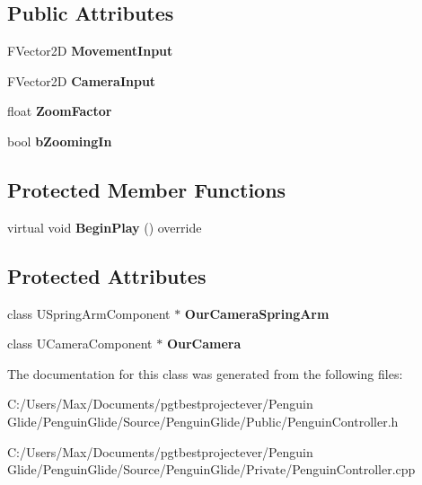 \subsection*{Public Attributes}
\begin{DoxyCompactItemize}
\item 
\mbox{\label{class_a_penguin_controller_ad5e38d4bab697a120a0aec8643aabdea}} 
F\+Vector2D {\bfseries Movement\+Input}
\item 
\mbox{\label{class_a_penguin_controller_ac51051e3396e7fa3f5dce0acc7a1d4ee}} 
F\+Vector2D {\bfseries Camera\+Input}
\item 
\mbox{\label{class_a_penguin_controller_a180900572c3dde77c68983f666438fe6}} 
float {\bfseries Zoom\+Factor}
\item 
\mbox{\label{class_a_penguin_controller_acbc53133774ad63c5c78f5b3a35627b1}} 
bool {\bfseries b\+Zooming\+In}
\end{DoxyCompactItemize}
\subsection*{Protected Member Functions}
\begin{DoxyCompactItemize}
\item 
\mbox{\label{class_a_penguin_controller_a68851e667e8f1347bf5734d715833bb1}} 
virtual void {\bfseries Begin\+Play} () override
\end{DoxyCompactItemize}
\subsection*{Protected Attributes}
\begin{DoxyCompactItemize}
\item 
\mbox{\label{class_a_penguin_controller_a3a4df57e4b129989aa3becb844437256}} 
class U\+Spring\+Arm\+Component $\ast$ {\bfseries Our\+Camera\+Spring\+Arm}
\item 
\mbox{\label{class_a_penguin_controller_a2b4212713e88cdba7f3ca02844e5a509}} 
class U\+Camera\+Component $\ast$ {\bfseries Our\+Camera}
\end{DoxyCompactItemize}


The documentation for this class was generated from the following files\+:\begin{DoxyCompactItemize}
\item 
C\+:/\+Users/\+Max/\+Documents/pgtbestprojectever/\+Penguin Glide/\+Penguin\+Glide/\+Source/\+Penguin\+Glide/\+Public/Penguin\+Controller.\+h\item 
C\+:/\+Users/\+Max/\+Documents/pgtbestprojectever/\+Penguin Glide/\+Penguin\+Glide/\+Source/\+Penguin\+Glide/\+Private/Penguin\+Controller.\+cpp\end{DoxyCompactItemize}
